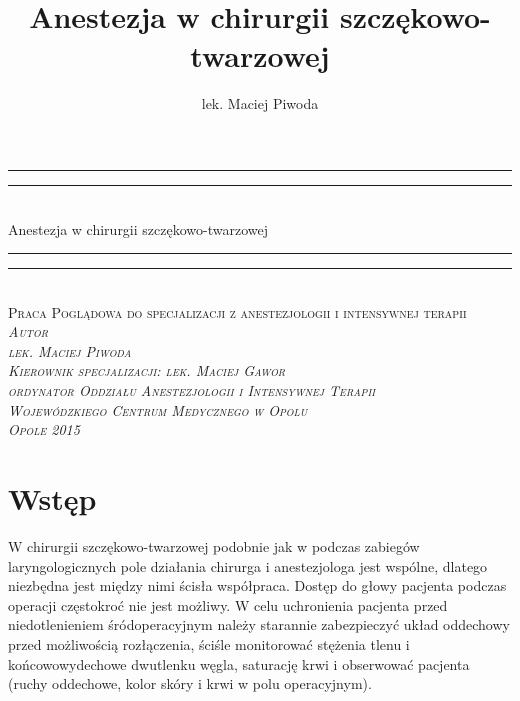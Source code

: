 \documentclass[a4paper, 12pt]{report}
\author{lek. Maciej Piwoda}
\title{Anestezja w chirurgii szczękowo-twarzowej}
\newcommand\blankpage{\newpage \null \thispagestyle{empty} \addtocounter{page}{-1}}
\begin{document}
\date{}
\begin{titlepage}
  \centering \vspace*{\baselineskip}
  \rule{\textwidth}{1.6pt}\vspace*{-\baselineskip}\vspace*{2pt}
  \rule{\textwidth}{0.4pt}\\[\baselineskip]
  {\LARGE Anestezja w chirurgii szczękowo-twarzowej}\\[0.2\baselineskip]
  \rule{\textwidth}{0.4pt}\vspace*{-\baselineskip}\vspace{3.2pt}
  \rule{\textwidth}{1.6pt}\\[\baselineskip]
  \scshape Praca Poglądowa do specjalizacji z anestezjologii
  i intensywnej terapii\\
  \vspace*{6\baselineskip}
  \itshape{Autor}\\
  {\large{lek. Maciej Piwoda}}\\
  \vfill
  \scshape
  Kierownik specjalizacji: lek. Maciej Gawor\\
  ordynator Oddziału Anestezjologii i Intensywnej Terapii\\
  Wojewódzkiego Centrum Medycznego w Opolu\\
  \vspace*{4\baselineskip}
  Opole 2015
\end{titlepage}
\blankpage
\titleformat{\chapter}[block]{\LARGE\rmfamily}{\thechapter}{1em}{\titlerule\\[.5ex]\bfseries}
\tableofcontents
\thispagestyle{empty}
\addtocounter{page}{-1}
\blankpage
\chapter*{Wstęp}

W chirurgii szczękowo-twarzowej podobnie jak w podczas zabiegów
laryngologicznych pole działania chirurga i anestezjologa jest
wspólne, dlatego niezbędna jest między nimi ścisła współpraca. Dostęp
do głowy pacjenta podczas operacji częstokroć nie jest możliwy. W celu
uchronienia pacjenta przed niedotlenieniem śródoperacyjnym należy
starannie zabezpieczyć układ oddechowy przed możliwością rozłączenia,
ściśle monitorować stężenia tlenu i końcowowydechowe dwutlenku węgla,
saturację krwi i obserwować pacjenta (ruchy oddechowe, kolor skóry i
krwi w polu operacyjnym). 
\end{document}
